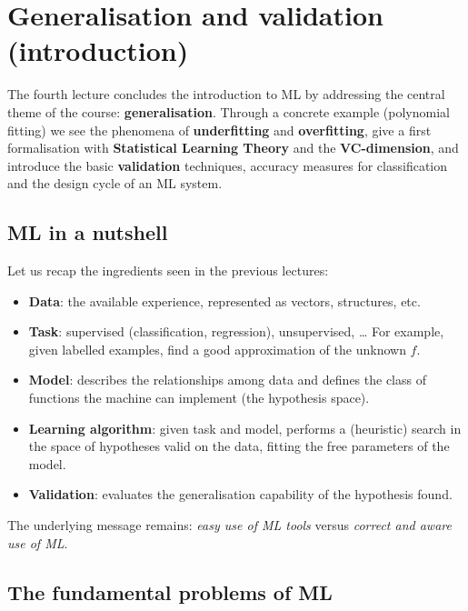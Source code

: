 \chapter{Generalisation and validation (introduction)}\label{ch-04}

The fourth lecture concludes the introduction to ML by addressing the
central theme of the course: \textbf{generalisation}. Through a
concrete example (polynomial fitting) we see the phenomena of
\textbf{underfitting} and \textbf{overfitting}, give a first
formalisation with \textbf{Statistical Learning Theory} and the
\textbf{VC-dimension}, and introduce the basic \textbf{validation}
techniques, accuracy measures for classification and the design cycle
of an ML system.

\section{ML in a nutshell}\label{il-ml-in-breve}

Let us recap the ingredients seen in the previous lectures:

\begin{itemize}
\tightlist
\item
  \textbf{Data}: the available experience, represented as vectors,
  structures, etc.
\item
  \textbf{Task}: supervised (classification, regression),
  unsupervised, \ldots{} For example, given labelled examples, find a
  good approximation of the unknown \(f\).
\item
  \textbf{Model}: describes the relationships among data and defines
  the class of functions the machine can implement (the hypothesis
  space).
\item
  \textbf{Learning algorithm}: given task and model, performs a
  (heuristic) search in the space of hypotheses valid on the data,
  fitting the free parameters of the model.
\item
  \textbf{Validation}: evaluates the generalisation capability of the
  hypothesis found.
\end{itemize}

The underlying message remains: \emph{easy use of ML tools} versus
\emph{correct and aware use of ML}.

\section{The fundamental problems of
ML}\label{i-problemi-fondamentali-del-ml}

